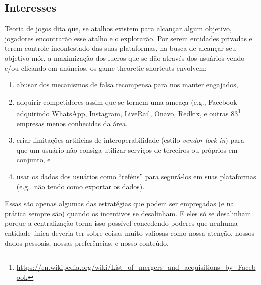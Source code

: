 


\subsection{Interesses}

Teoria de jogos dita que, se atalhos existem para alcançar algum objetivo, jogadores encontrarão esse atalho e o explorarão.
Por serem entidades privadas e terem controle incontestado das suas plataformas, na busca de alcançar seu objetivo-mór, a maximização dos lucros que se dão através dos usuários vendo e/ou clicando em anúncios, os game-theoretic shortcuts envolvem:
\begin{enumerate}
    \item abusar dos mecanismos de falsa recompensa  para nos manter engajados,
    \item adquirir competidores assim que se tornem uma ameaça (e.g., Facebook adquirindo WhatsApp, Instagram, LiveRail, Onavo, Redkix, e outras 83\footnote{\url{https://en.wikipedia.org/wiki/List_of_mergers_and_acquisitions_by_Facebook}} empresas menos conhecidas da área.
    \item criar limitações artificias de interoperabilidade (estilo \textit{vendor lock-in}) para que um usuário não consiga utilizar serviços de terceiros ou próprios em conjunto, e
    \item usar os dados dos usuários como ``reféns'' para segurá-los em suas plataformas (e.g., não tendo como exportar os dados).
\end{enumerate}
Essas são apenas algumas das estratégias que podem ser empregadas (e na prática sempre são) quando os incentivos se desalinham.
E eles só se desalinham porque a centralização torna isso possível concedendo poderes que nenhuma entidade única deveria ter sobre coisas muito valiosas como nossa atenção, nossos dados pessoais, nossas preferências, e nosso conteúdo.

